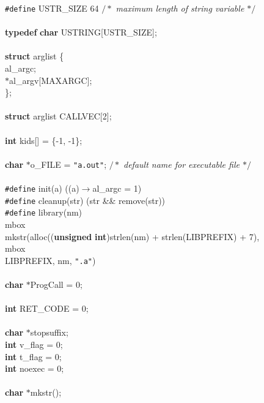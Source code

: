 \begin{flushleft}
{\tt \#define} USTR\_SIZE 64 {$/\ast$\it{} maximum length of string variable $\ast/$}\mbox{}\\
\mbox{}\\
{\bf typedef} {\bf char} USTRING[USTR\_SIZE];\mbox{}\\
\mbox{}\\
{\bf struct} arglist \{\mbox{}\\
\hspace*{3\indentation}{\bf int} al\_argc;\mbox{}\\
\hspace*{3\indentation}{\bf char} $\ast$al\_argv[MAXARGC];\mbox{}\\
\};\mbox{}\\
\mbox{}\\
{\bf struct} arglist CALLVEC[2];\mbox{}\\
\mbox{}\\
{\bf int} kids[] = \{-1, -1\};\mbox{}\\
\mbox{}\\
{\bf char} $\ast$o\_FILE = {\tt"a.out"}; {$/\ast$\it{} default name for executable file $\ast/$}\mbox{}\\
\mbox{}\\
{\tt \#define} init(a)      ((a)$\rightarrow$al\_argc = 1)\mbox{}\\
{\tt \#define} cleanup(str)    (str \&\& remove(str))\mbox{}\\
{\tt \#define} library(nm) \\mbox{}\\
\hspace*{3\indentation}mkstr(alloc(({\bf unsigned} {\bf int})strlen(nm) + strlen(LIBPREFIX) + 7), \\mbox{}\\
\hspace*{6\indentation}LIBPREFIX, nm, {\tt".a"})\mbox{}\\
\mbox{}\\
{\bf char} $\ast$ProgCall = 0;\mbox{}\\
\mbox{}\\
{\bf int} RET\_CODE = 0;\mbox{}\\
\mbox{}\\
{\bf char} $\ast$stopsuffix;\mbox{}\\
{\bf int} v\_flag = 0;\mbox{}\\
{\bf int} t\_flag = 0;\mbox{}\\
{\bf int} noexec = 0;\mbox{}\\
\mbox{}\\
{\bf char} $\ast$mkstr();\mbox{}\\

\end{flushleft}
